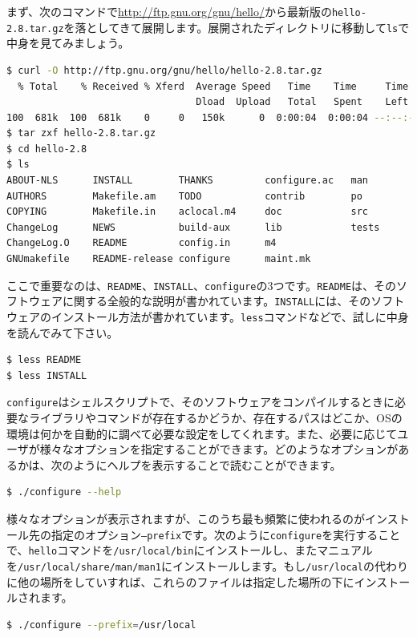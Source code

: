 まず、次のコマンドで\url{http://ftp.gnu.org/gnu/hello/}から最新版の\texttt{hello-2.8.tar.gz}を落としてきて展開します。展開されたディレクトリに移動して\texttt{ls}で中身を見てみましょう。

\begin{lstlisting}[language=bash]
$ curl -O http://ftp.gnu.org/gnu/hello/hello-2.8.tar.gz
  % Total    % Received % Xferd  Average Speed   Time    Time     Time  Current
                                 Dload  Upload   Total   Spent    Left  Speed
100  681k  100  681k    0     0   150k      0  0:00:04  0:00:04 --:--:--  166k
$ tar zxf hello-2.8.tar.gz
$ cd hello-2.8 
$ ls
ABOUT-NLS      INSTALL        THANKS         configure.ac   man
AUTHORS        Makefile.am    TODO           contrib        po
COPYING        Makefile.in    aclocal.m4     doc            src
ChangeLog      NEWS           build-aux      lib            tests
ChangeLog.O    README         config.in      m4
GNUmakefile    README-release configure      maint.mk
\end{lstlisting}

ここで重要なのは、\texttt{README}、\texttt{INSTALL}、\texttt{configure}の3つです。\texttt{README}は、そのソフトウェアに関する全般的な説明が書かれています。\texttt{INSTALL}には、そのソフトウェアのインストール方法が書かれています。\texttt{less}コマンドなどで、試しに中身を読んでみて下さい。

\begin{lstlisting}[language=bash]
$ less README
$ less INSTALL
\end{lstlisting}

\texttt{configure}はシェルスクリプトで、そのソフトウェアをコンパイルするときに必要なライブラリやコマンドが存在するかどうか、存在するパスはどこか、OSの環境は何かを自動的に調べて必要な設定をしてくれます。また、必要に応じてユーザが様々なオプションを指定することができます。どのようなオプションがあるかは、次のようにヘルプを表示することで読むことができます。

\begin{lstlisting}[language=bash]
$ ./configure --help
\end{lstlisting}

様々なオプションが表示されますが、このうち最も頻繁に使われるのがインストール先の指定のオプション\texttt{--prefix}です。次のように\texttt{configure}を実行することで、\texttt{hello}コマンドを\texttt{/usr/local/bin}にインストールし、またマニュアルを\texttt{/usr/local/share/man/man1}にインストールします。もし\texttt{/usr/local}の代わりに他の場所をしていすれば、これらのファイルは指定した場所の下にインストールされます。
\begin{lstlisting}[language=bash]
$ ./configure --prefix=/usr/local
\end{lstlisting} 

